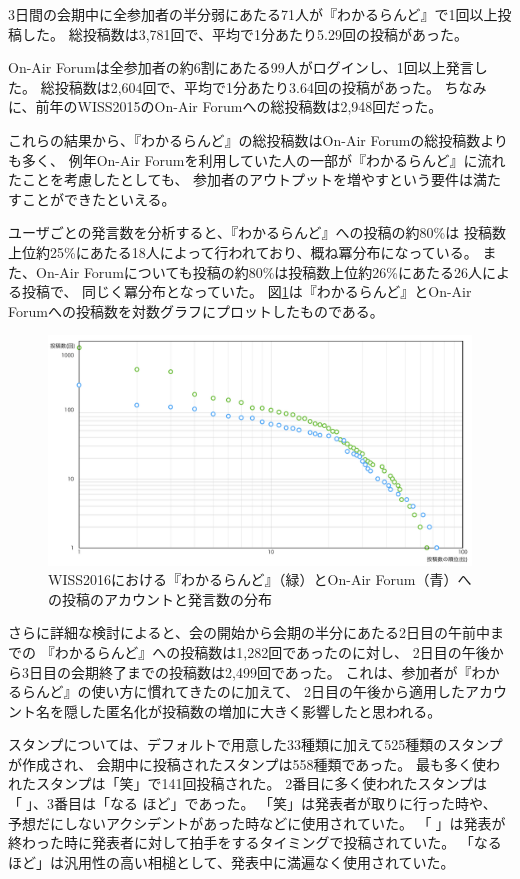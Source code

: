 3日間の会期中に全参加者の半分弱にあたる71人が『わかるらんど』で1回以上投稿した。
総投稿数は3,781回で、平均で1分あたり5.29回の投稿があった。

On-Air Forumは全参加者の約6割にあたる99人がログインし、1回以上発言した。
総投稿数は2,604回で、平均で1分あたり3.64回の投稿があった。
ちなみに、前年のWISS2015のOn-Air Forumへの総投稿数は2,948回だった。

これらの結果から、『わかるらんど』の総投稿数はOn-Air Forumの総投稿数よりも多く、
例年On-Air Forumを利用していた人の一部が『わかるらんど』に流れたことを考慮したとしても、
参加者のアウトプットを増やすという要件は満たすことができたといえる。

ユーザごとの発言数を分析すると、『わかるらんど』への投稿の約80\%は
投稿数上位約25\%にあたる18人によって行われており、概ね冪分布になっている。
また、On-Air Forumについても投稿の約80\%は投稿数上位約26\%にあたる26人による投稿で、
同じく冪分布となっていた。
図\ref{wiss2016compare}は『わかるらんど』とOn-Air Forumへの投稿数を対数グラフにプロットしたものである。

\begin{figure}[h]
\centering
\includegraphics[width=12cm]{images/wiss2016compare.png}
\caption{WISS2016における『わかるらんど』（緑）とOn-Air Forum（青）への投稿のアカウントと発言数の分布}
\label{wiss2016compare}
\end{figure}

さらに詳細な検討によると、会の開始から会期の半分にあたる2日目の午前中までの
『わかるらんど』への投稿数は1,282回であったのに対し、
2日目の午後から3日目の会期終了までの投稿数は2,499回であった。
これは、参加者が『わかるらんど』の使い方に慣れてきたのに加えて、
2日目の午後から適用したアカウント名を隠した匿名化が投稿数の増加に大きく影響したと思われる。

スタンプについては、デフォルトで用意した33種類に加えて525種類のスタンプが作成され、
会期中に投稿されたスタンプは558種類であった。
最も多く使われたスタンプは「笑」で141回投稿された。
2番目に多く使われたスタンプは「👏」、3番目は「なる ほど」であった。
「笑」は発表者が取りに行った時や、
予想だにしないアクシデントがあった時などに使用されていた。
「👏」は発表が終わった時に発表者に対して拍手をするタイミングで投稿されていた。
「なる ほど」は汎用性の高い相槌として、発表中に満遍なく使用されていた。

